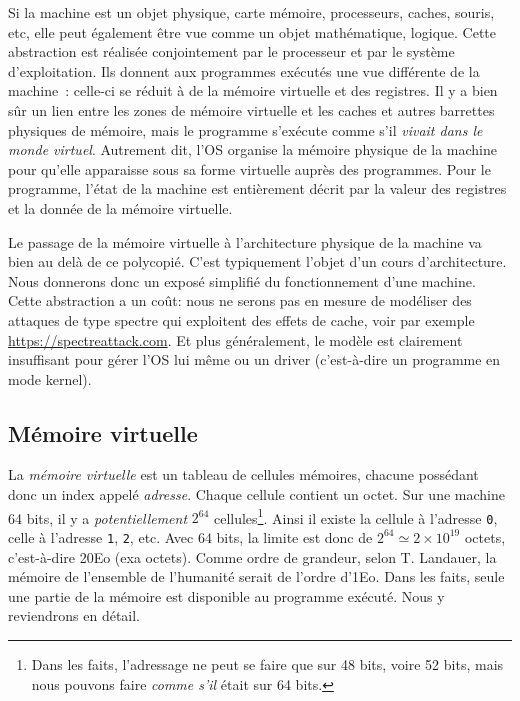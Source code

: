 \documentclass{book}
\newcommand{\code}[1]{\texttt{#1}}
\begin{document}
{Si la machine est un objet physique, carte mémoire, processeurs, caches, souris, etc, elle peut également être vue comme un objet mathématique, logique. Cette abstraction est réalisée conjointement par le processeur et par le système d'exploi\-tation. Ils donnent aux programmes exécutés une vue différente de la machine~: celle-ci se réduit à de la mémoire virtuelle et des registres. Il y a bien sûr un lien entre les zones de mémoire virtuelle et les caches et autres barrettes physiques de mémoire, mais le programme s'exécute comme s'il \emph{vivait dans le monde virtuel}. Autrement dit, l'OS organise la mémoire physique de la machine pour qu'elle apparaisse sous sa forme virtuelle auprès des programmes. Pour le programme, l'état de la machine est entièrement décrit par la valeur des registres et la donnée de la mémoire virtuelle. 

Le passage de la mémoire virtuelle à l'architecture physique de la machine va bien au delà de ce polycopié. C'est typiquement l'objet d'un cours d'architecture. Nous donnerons donc un exposé simplifié du fonctionnement d'une machine. Cette abstraction a un coût: nous ne serons pas en mesure de modéliser des attaques de type {\sc spectre} qui exploitent des effets de cache, voir par exemple \url{https://spectreattack.com}. Et plus généralement, le modèle est clairement insuffisant pour gérer l'OS lui même ou un driver (c'est-à-dire un programme en mode kernel). 


\subsection{Mémoire virtuelle}

La \emph{mémoire virtuelle} est un tableau de cellules mémoires, chacune possédant donc un index appelé \emph{adresse}. Chaque cellule contient un octet. Sur une machine 64 bits, il y a \emph{potentiellement} $2^{64}$ cellules\footnote{Dans les faits,  l'adressage ne peut se faire que sur 48 bits, voire 52 bits, mais nous pouvons faire \emph{comme s'il} était sur 64 bits.}. Ainsi il existe la cellule à l'adresse \code{0}, celle à l'adresse \code{1}, \code{2}, etc. Avec $64$ bits, la limite est donc de $2^{64} \simeq 2 \times 10^{19}$ octets, c'est-à-dire 20Eo (exa octets). Comme ordre de grandeur, selon T. Landauer, la mémoire de l'ensemble de l'humanité serait de l'ordre d'1Eo. Dans les faits, seule une partie de la mémoire est disponible au programme exécuté. Nous y reviendrons en détail.  

}
\end{document}

